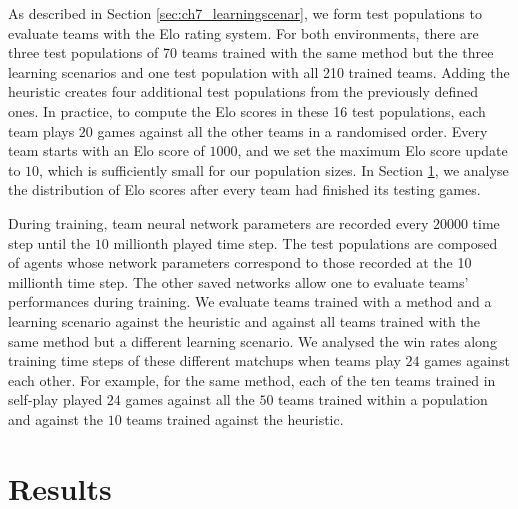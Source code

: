 As described in Section \ref{sec:ch7_learningscenar}, we form test populations to evaluate teams with the Elo rating system.
For both environments, there are three test populations of 70 teams trained with the same method but the three learning scenarios and one test population with all 210 trained teams.
Adding the heuristic creates four additional test populations from the previously defined ones.
In practice, to compute the Elo scores in these 16 test populations, each team plays $20$ games against all the other teams in a randomised order.
Every team starts with an Elo score of $1000$, and we set the maximum Elo score update to $10$, which is sufficiently small for our population sizes.
In Section \ref{sec:ch7_results}, we analyse the distribution of Elo scores after every team had finished its testing games.

During training, team neural network parameters are recorded every $20000$ time step until the $10$ millionth played time step.
The test populations are composed of agents whose network parameters correspond to those recorded at the 10 millionth time step.
The other saved networks allow one to evaluate teams' performances during training.
We evaluate teams trained with a method and a learning scenario against the heuristic and against all teams trained with the same method but a different learning scenario.
We analysed the win rates along training time steps of these different matchups when teams play $24$ games against each other.
For example, for the same method, each of the ten teams trained in self-play played $24$ games against all the $50$ teams trained within a population and against the $10$ teams trained against the heuristic.

\section{Results} \label{sec:ch7_results}

\begin{figure}
 
\end{figure} 

